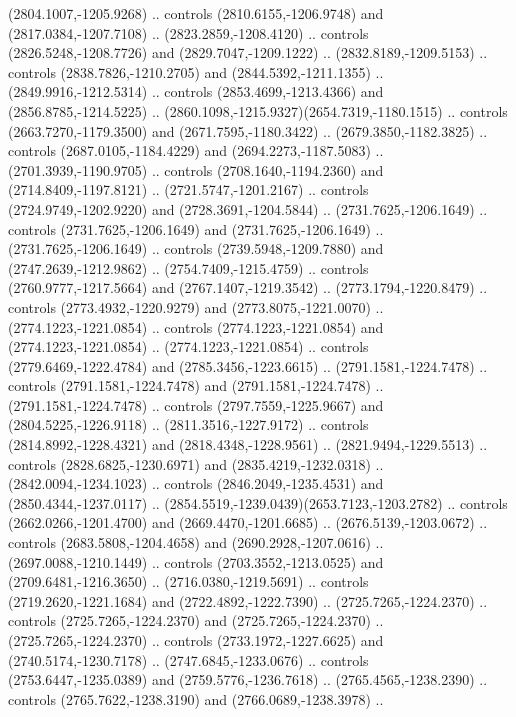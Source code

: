 \begin{scope}[shift={(28.3138,-376.6591)}]
\begin{scope}[shift={(-2186.6262,1813.8454)}]
      (2804.1007,-1205.9268) .. controls (2810.6155,-1206.9748) and
      (2817.0384,-1207.7108) .. (2823.2859,-1208.4120) .. controls
      (2826.5248,-1208.7726) and (2829.7047,-1209.1222) .. (2832.8189,-1209.5153) ..
      controls (2838.7826,-1210.2705) and (2844.5392,-1211.1355) ..
      (2849.9916,-1212.5314) .. controls (2853.4699,-1213.4366) and
      (2856.8785,-1214.5225) .. (2860.1098,-1215.9327)(2654.7319,-1180.1515) ..
      controls (2663.7270,-1179.3500) and (2671.7595,-1180.3422) ..
      (2679.3850,-1182.3825) .. controls (2687.0105,-1184.4229) and
      (2694.2273,-1187.5083) .. (2701.3939,-1190.9705) .. controls
      (2708.1640,-1194.2360) and (2714.8409,-1197.8121) .. (2721.5747,-1201.2167) ..
      controls (2724.9749,-1202.9220) and (2728.3691,-1204.5844) ..
      (2731.7625,-1206.1649) .. controls (2731.7625,-1206.1649) and
      (2731.7625,-1206.1649) .. (2731.7625,-1206.1649) .. controls
      (2739.5948,-1209.7880) and (2747.2639,-1212.9862) .. (2754.7409,-1215.4759) ..
      controls (2760.9777,-1217.5664) and (2767.1407,-1219.3542) ..
      (2773.1794,-1220.8479) .. controls (2773.4932,-1220.9279) and
      (2773.8075,-1221.0070) .. (2774.1223,-1221.0854) .. controls
      (2774.1223,-1221.0854) and (2774.1223,-1221.0854) .. (2774.1223,-1221.0854) ..
      controls (2779.6469,-1222.4784) and (2785.3456,-1223.6615) ..
      (2791.1581,-1224.7478) .. controls (2791.1581,-1224.7478) and
      (2791.1581,-1224.7478) .. (2791.1581,-1224.7478) .. controls
      (2797.7559,-1225.9667) and (2804.5225,-1226.9118) .. (2811.3516,-1227.9172) ..
      controls (2814.8992,-1228.4321) and (2818.4348,-1228.9561) ..
      (2821.9494,-1229.5513) .. controls (2828.6825,-1230.6971) and
      (2835.4219,-1232.0318) .. (2842.0094,-1234.1023) .. controls
      (2846.2049,-1235.4531) and (2850.4344,-1237.0117) ..
      (2854.5519,-1239.0439)(2653.7123,-1203.2782) .. controls
      (2662.0266,-1201.4700) and (2669.4470,-1201.6685) .. (2676.5139,-1203.0672) ..
      controls (2683.5808,-1204.4658) and (2690.2928,-1207.0616) ..
      (2697.0088,-1210.1449) .. controls (2703.3552,-1213.0525) and
      (2709.6481,-1216.3650) .. (2716.0380,-1219.5691) .. controls
      (2719.2620,-1221.1684) and (2722.4892,-1222.7390) .. (2725.7265,-1224.2370) ..
      controls (2725.7265,-1224.2370) and (2725.7265,-1224.2370) ..
      (2725.7265,-1224.2370) .. controls (2733.1972,-1227.6625) and
      (2740.5174,-1230.7178) .. (2747.6845,-1233.0676) .. controls
      (2753.6447,-1235.0389) and (2759.5776,-1236.7618) .. (2765.4565,-1238.2390) ..
      controls (2765.7622,-1238.3190) and (2766.0689,-1238.3978) ..

\end{scope}
\end{scope}
